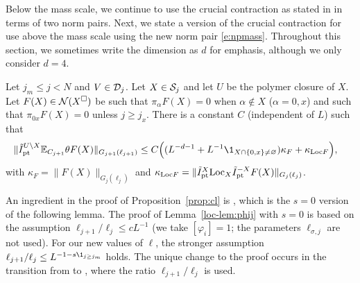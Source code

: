 Below the mass scale, we continue to use the crucial contraction as stated in
\cite[Proposition \ref{IE-prop:cl}]{BS-rg-IE} in terms of two norm pairs.
Next, we state a version of the crucial contraction for use above the mass
scale using the new norm pair \eqref{e:npmass}.
Throughout this section, we
sometimes write the dimension as $d$ for emphasis, although we only consider $d=4$.


\begin{prop}
\label{prop:cl} Let $j_m \leq j<N$ and $V\in \mathcal{D}_j$.  Let $X \in \mathcal{S}_j$ and
let $U$ be the polymer closure of $X$.  Let $F(X) \in \mathcal{N}(X^\Box)$ be such that
$\pi_\alpha F(X) = 0$ when $\alpha\notin X$ ($\alpha = 0, x$) and such that
$\pi_{0x}F(X)=0$ unless $j \ge j_x$.
{There is a constant $C$ (independent of $L$) such that}
\begin{align}
    \label{e:contraction3z-new}
    \|\Ipttil^{U\setminus X} \Ex_{C_{j+1}} \theta F (X) \|_{{G_{j+1}(\ell_{j+1})}}
    &
    \leq C \Big(
    ( L^{-d -1} +  L^{-1}\1_{X \cap \{0,x\} \not = \varnothing} )
    \kappa_F
    + \kappa_{\LT F}
    \Big)
    ,
\end{align}
with $\kappa_F=\|F (X)\|_{{G_{j}(\ell_{j})}}$ and
$\kappa_{{\rm Loc} F} =\|\tilde{I}_{\rm pt}^X {\rm Loc}_X \tilde{I}_{\rm pt}^{-X} F(X) \|_{{G_{j}(\ell_{j})}}$.
\end{prop}

An ingredient in the proof of Proposition~\ref{prop:cl} is
\cite[Lemma~\ref{loc-lem:phij}]{BS-rg-loc}, which is the $s=0$ version of
the following lemma.
The proof of Lemma~\ref{loc-lem:phij} with $s = 0$
is based on the assumption  $\ell_{j+1}/\ell_j \leq  cL^{-1}$
(we take $[\varphi_i]=1$; the parameters $\ell_{\sigma,j}$ are not used).
For our new values of $\ell$, the stronger assumption
$\ell_{j+1}/\ell_j \leq L^{-1 - s \1_{j \geq j_m}}$ holds.
The unique change to the proof occurs in the transition from
\cite[\eqref{loc-e:gTay1}]{BS-rg-loc} to
\cite[\eqref{loc-e:rhognew}]{BS-rg-loc}, where the ratio
$\ell_{j+1}/\ell_j$ is used.

